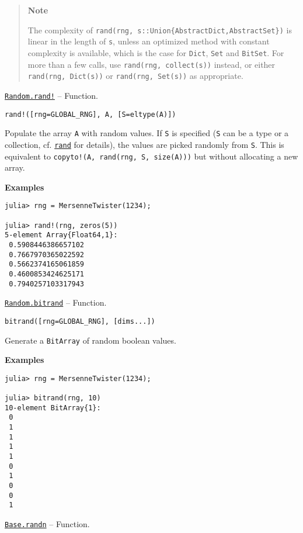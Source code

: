 \begin{adjustwidth}{2em}{0pt}
\begin{quote}
\textbf{Note}

The complexity of \texttt{rand(rng, s::Union\{AbstractDict,AbstractSet\})} is linear in the length of \texttt{s}, unless an optimized method with constant complexity is available, which is the case for \texttt{Dict}, \texttt{Set} and \texttt{BitSet}. For more than a few calls, use \texttt{rand(rng, collect(s))} instead, or either \texttt{rand(rng, Dict(s))} or \texttt{rand(rng, Set(s))} as appropriate.

\end{quote}


\end{adjustwidth}
\hypertarget{7078395971362144272}{} 
\hyperlink{7078395971362144272}{\texttt{Random.rand!}}  -- {Function.}

\begin{adjustwidth}{2em}{0pt}


\begin{verbatim}
rand!([rng=GLOBAL_RNG], A, [S=eltype(A)])
\end{verbatim}

Populate the array \texttt{A} with random values. If \texttt{S} is specified (\texttt{S} can be a type or a collection, cf. \hyperlink{7668863842145012694}{\texttt{rand}} for details), the values are picked randomly from \texttt{S}. This is equivalent to \texttt{copyto!(A, rand(rng, S, size(A)))} but without allocating a new array.

\textbf{Examples}


\begin{verbatim}
julia> rng = MersenneTwister(1234);

julia> rand!(rng, zeros(5))
5-element Array{Float64,1}:
 0.5908446386657102
 0.7667970365022592
 0.5662374165061859
 0.4600853424625171
 0.7940257103317943
\end{verbatim}



\end{adjustwidth}
\hypertarget{6994846923428691074}{} 
\hyperlink{6994846923428691074}{\texttt{Random.bitrand}}  -- {Function.}

\begin{adjustwidth}{2em}{0pt}


\begin{verbatim}
bitrand([rng=GLOBAL_RNG], [dims...])
\end{verbatim}

Generate a \texttt{BitArray} of random boolean values.

\textbf{Examples}


\begin{verbatim}
julia> rng = MersenneTwister(1234);

julia> bitrand(rng, 10)
10-element BitArray{1}:
 0
 1
 1
 1
 1
 0
 1
 0
 0
 1
\end{verbatim}



\end{adjustwidth}
\hypertarget{7347069443766288058}{} 
\hyperlink{7347069443766288058}{\texttt{Base.randn}}  -- {Function.}

